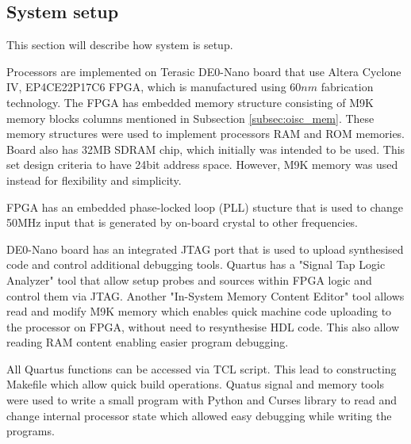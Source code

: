 \begin{colfigure}
	\label{fig:assembler}
\end{colfigure}

\subsection{System setup}\label{subsec:setup}
This section will describe how system is setup.

Processors are implemented on Terasic DE0-Nano board that use Altera Cyclone IV, EP4CE22P17C6 FPGA, which is manufactured using $60nm$ fabrication technology.
The FPGA has embedded memory structure consisting of M9K memory blocks columns mentioned in Subsection \ref{subsec:oisc_mem}. These memory structures were used to implement processors RAM and ROM memories. Board also has 32MB SDRAM chip, which initially was intended to be used. This set design criteria to have 24bit address space. However, M9K memory was used instead for flexibility and simplicity. 

FPGA has an embedded phase-locked loop (PLL) stucture that is used to change 50MHz input that is generated by on-board crystal to other frequencies. 

DE0-Nano board has an integrated JTAG port that is used to upload synthesised code and control additional debugging tools. Quartus has a "Signal Tap Logic Analyzer" tool that allow setup probes and sources within FPGA logic and control them via JTAG. Another "In-System Memory Content Editor" tool allows read and modify M9K memory which enables quick machine code uploading to the processor on FPGA, without need to resynthesise HDL code. This also allow reading RAM content enabling easier program debugging. 

All Quartus functions can be accessed via TCL script. This lead to constructing Makefile which allow quick build operations. Quatus signal and memory tools were used to write a small program with Python and Curses library to read and change internal processor state which allowed easy debugging while writing the programs. 


